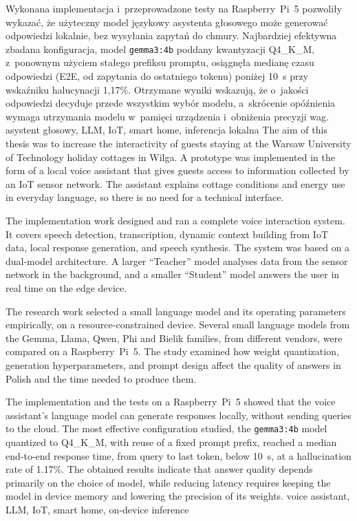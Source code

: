 \documentclass[
    a4paper,
    left=25mm,         %
    right=25mm,        %
    top=25mm,          %
    bottom=25mm,         %
    bindingoffset=5mm,  %
    nohyphenation=false %
]{src/wut-thesis}
\begin{document}
Wykonana implementacja i~przeprowadzone testy na Raspberry~Pi~5 pozwoliły wykazać, że użyteczny model językowy asystenta głosowego może generować odpowiedzi lokalnie, bez wysyłania zapytań do chmury. Najbardziej efektywna zbadana konfiguracja, model \texttt{gemma3:4b} poddany kwantyzacji Q4\_K\_M, z~ponownym użyciem stałego prefiksu promptu, osiągnęła medianę czasu odpowiedzi (E2E, od zapytania do ostatniego tokenu) poniżej 10~s przy wskaźniku halucynacji 1{,}17\%. Otrzymane wyniki wskazują, że o~jakości odpowiedzi decyduje przede wszystkim wybór modelu, a~skrócenie opóźnienia wymaga utrzymania modelu w~pamięci urządzenia i~obniżenia precyzji wag.
\slowakluczowe asystent głosowy, LLM, IoT, smart home, inferencja lokalna
\cleardoublepage
\abstract The aim of this thesis was to increase the interactivity of guests staying at the Warsaw University of Technology holiday cottages in Wilga. A prototype was implemented in the form of a local voice assistant that gives guests access to information collected by an IoT sensor network. The assistant explains cottage conditions and energy use in everyday language, so there is no need for a technical interface.

The implementation work designed and ran a complete voice interaction system. It covers speech detection, transcription, dynamic context building from IoT data, local response generation, and speech synthesis. The system was based on a dual-model architecture. A larger ``Teacher'' model analyses data from the sensor network in the background, and a smaller ``Student'' model answers the user in real time on the edge device.

The research work selected a small language model and its operating parameters empirically, on a resource-constrained device. Several small language models from the Gemma, Llama, Qwen, Phi and Bielik families, from different vendors, were compared on a Raspberry~Pi~5. The study examined how weight quantization, generation hyperparameters, and prompt design affect the quality of answers in Polish and the time needed to produce them.

The implementation and the tests on a Raspberry~Pi~5 showed that the voice assistant’s language model can generate responses locally, without sending queries to the cloud. The most effective configuration studied, the \texttt{gemma3:4b} model quantized to Q4\_K\_M, with reuse of a fixed prompt prefix, reached a median end-to-end response time, from query to last token, below 10~s, at a hallucination rate of 1.17\%. The obtained results indicate that answer quality depends primarily on the choice of model, while reducing latency requires keeping the model in device memory and lowering the precision of its weights.
\keywords voice assistant, LLM, IoT, smart home, on-device inference
\end{document}
